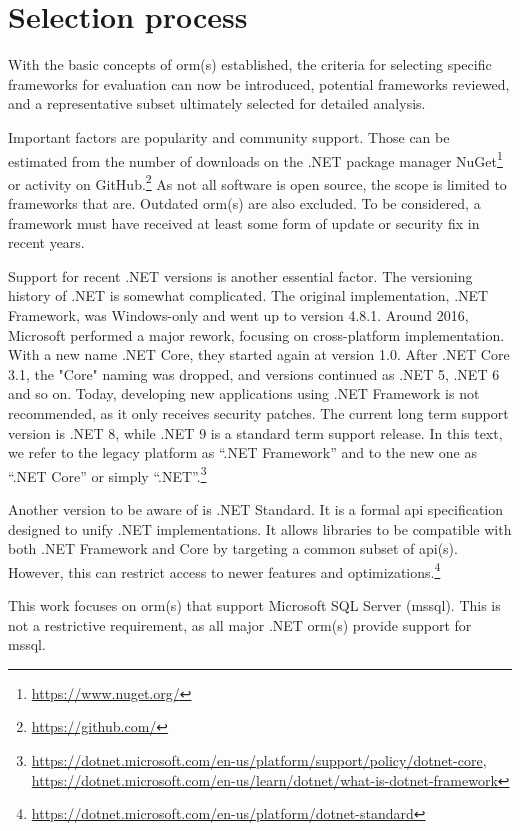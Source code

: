 \section{Selection process}
With the basic concepts of \acrshort{orm}(s) established, the criteria for selecting specific frameworks for evaluation can now be introduced, potential frameworks reviewed, and a representative subset ultimately selected for detailed analysis.

Important factors are popularity and community support. Those can be estimated from the number of downloads on the .NET package manager NuGet\footnote{\url{https://www.nuget.org/}} or activity on GitHub.\footnote{\url{https://github.com/}} As not all software is open source, the scope is limited to frameworks that are. Outdated \acrshort{orm}(s) are also excluded. To be considered, a framework must have received at least some form of update or security fix in recent years.

Support for recent .NET versions is another essential factor. The versioning history of .NET is somewhat complicated. The original implementation, .NET Framework, was Windows-only and went up to version 4.8.1. Around 2016, Microsoft performed a major rework, focusing on cross-platform implementation. With a new name .NET Core, they started again at version 1.0. After .NET Core 3.1, the "Core" naming was dropped, and versions continued as .NET 5, .NET 6 and so on. Today, developing new applications using .NET Framework is not recommended, as it only receives security patches. The current long term support version is .NET 8, while .NET 9 is a standard term support release. In this text, we refer to the legacy platform as ``.NET Framework'' and to the new one as ``.NET Core'' or simply ``.NET''.\footnote{\url{https://dotnet.microsoft.com/en-us/platform/support/policy/dotnet-core}, \url{https://dotnet.microsoft.com/en-us/learn/dotnet/what-is-dotnet-framework}}

Another version to be aware of is .NET Standard. It is a formal \acrshort{api} specification designed to unify .NET implementations. It allows libraries to be compatible with both .NET Framework and Core by targeting a common subset of \acrshort{api}(s). However, this can restrict access to newer features and optimizations.\footnote{\url{https://dotnet.microsoft.com/en-us/platform/dotnet-standard}}

This work focuses on \acrshort{orm}(s) that support Microsoft SQL Server (\acrshort{mssql}). This is not a restrictive requirement, as all major .NET \acrshort{orm}(s) provide support for \acrshort{mssql}.

